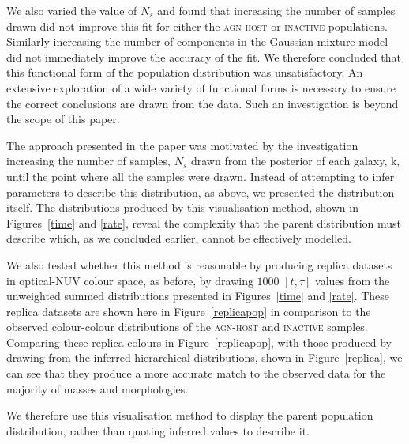 \documentclass[useAMS,usenatbib]{mn2e}
\begin{document}
{We also varied the value of $N_s$ and found that increasing the number of samples drawn did not improve this fit for either the \textsc{agn-host} or \textsc{inactive} populations. Similarly increasing the number of components in the Gaussian mixture model did not immediately improve the accuracy of the fit.  We therefore concluded that this functional form of the population distribution was unsatisfactory. An extensive exploration of a wide variety of functional forms is necessary to ensure the correct conclusions are drawn from the data. Such an investigation is beyond the scope of this paper. 

The approach presented in the paper was motivated by the investigation increasing the number of samples, $N_s$ drawn from the posterior of each galaxy, k, until the point where all the samples were drawn. Instead of attempting to infer parameters to describe this distribution, as above, we presented the distribution itself.  The distributions produced by this visualisation method, shown in Figures~\ref{time} and \ref{rate}, reveal the complexity that the parent distribution must describe which, as we concluded earlier, cannot be effectively modelled.

We also tested whether this method is reasonable by producing replica datasets in optical-NUV colour space, as before, by drawing $1000$ $[t, \tau]$ values from the unweighted summed distributions presented in Figures~\ref{time} and \ref{rate}. These replica datasets are shown here in Figure~\ref{replicapop} in comparison to the observed colour-colour distributions of the \textsc{agn-host} and \textsc{inactive} samples. Comparing these replica colours in Figure~\ref{replicapop}, with those produced by drawing from the inferred hierarchical distributions, shown in Figure~\ref{replica}, we can see that they produce a more accurate match to the observed data for the majority of masses and morphologies. 

We therefore use this visualisation method to display the parent population distribution, rather than quoting inferred values to describe it.}
\end{document}
